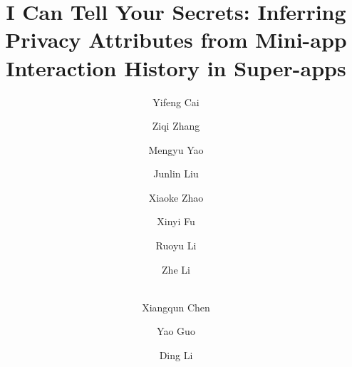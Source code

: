 \usepackage{filecontents}
\usepackage{microtype}
\usepackage[affil-it]{authblk}


\thispagestyle{empty}
\pagestyle{empty}



\date{}

\title{I Can Tell Your Secrets: Inferring Privacy Attributes from Mini-app Interaction History in Super-apps}


\author[1]{Yifeng Cai}
\author[2]{Ziqi Zhang}
\author[1]{Mengyu Yao}
\author[1]{Junlin Liu}
\author[3]{Xiaoke Zhao}
\author[3]{Xinyi Fu}
\author[3]{Ruoyu Li}
\author[3]{Zhe Li}
\author[1]{\\Xiangqun Chen}
\author[1]{Yao Guo}
\author[1]{Ding Li}


\maketitle

